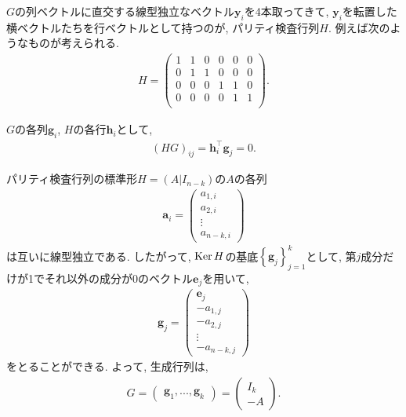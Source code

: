 \begin{ex}
    \label{ex10.17}
    $G$の列ベクトルに直交する線型独立なベクトル$\bm{y}_i$を4本取ってきて, $\bm{y}_i$を転置した横ベクトルたちを行ベクトルとして持つのが, パリティ検査行列$H$. 例えば次のようなものが考えられる.
    \begin{align*}
        H =
        \begin{pmatrix}
            1 & 1 & 0 & 0 & 0 & 0 \\
            0 & 1 & 1 & 0 & 0 & 0 \\
            0 & 0 & 0 & 1 & 1 & 0 \\
            0 & 0 & 0 & 0 & 1 & 1 \\
        \end{pmatrix}.
    \end{align*}
\end{ex}

\begin{ex}
    \label{ex10.18}
    $G$の各列$\bm{g}_i$, $H$の各行$\bm{h}_i$として,
    \begin{align*}
        \left( HG\right)_{ij} = \bm{h}_i^\top \bm{g}_j = 0.
    \end{align*}
\end{ex}

\begin{ex}
    \label{ex10.19}
    パリティ検査行列の標準形$H = \left( A | I_{n-k}\right)$の$A$の各列
    \begin{align*}
        \bm{a}_i =
        \begin{pmatrix}
            a_{1,i} \\
            a_{2,i} \\
            \vdots  \\
            a_{n-k, i}
        \end{pmatrix}
    \end{align*}
    は互いに線型独立である. したがって, $\operatorname{Ker}{H}$の基底$\left\{ \bm{g}_j \right\}_{j=1}^k$として, 第$j$成分だけが1でそれ以外の成分が0のベクトル$\bm{e}_j$を用いて,
    \begin{align*}
        \bm{g}_j
        =
        \begin{pmatrix}
            \bm{e}_j   \\
            - a_{1, j} \\
            - a_{2, j} \\
            \vdots     \\
            - a_{n-k, j}
        \end{pmatrix}
    \end{align*}
    をとることができる. よって, 生成行列は,
    \begin{align*}
        G =
        \begin{pmatrix}
            \bm{g}_1, ..., \bm{g}_k
        \end{pmatrix}
        =
        \begin{pmatrix}
            I_{k} \\
            -A
        \end{pmatrix}.
    \end{align*}
\end{ex}

